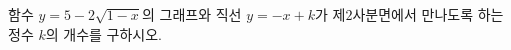 \hspace*{2mm}\begin{minipage}[t]{\dimexpr\linewidth-2mm\relax}\vspace{0pt}
함수 $y=5-2\sqrt{1-x}$의 그래프와 직선 $y=-x+k$가 제$2$사분면에서 만나도록 하는 정수 $k$의 개수를 구하시오.\end{minipage}
